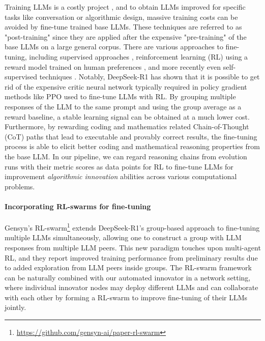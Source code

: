 \documentclass[12pt, legalpaper]{article}
\begin{document}
Training LLMs is a costly project \citep{nikolic_survey_2022}, and to obtain LLMs improved for specific tasks like conversation or algorithmic design, massive training costs can be avoided by fine-tune trained base LLMs. 
These techniques are referred to as "post-training" since they are applied after the expensive "pre-training" of the base LLMs on a large general corpus. 
There are various approaches to fine-tuning, including supervised approaches \citep{stiennon2020learning}, reinforcement learning (RL) using a reward model trained on human preferences \citep{ouyang2022training, ye2025robust}, and more recently even self-supervised techniques \citep{wen2025unsupervised}. 
Notably, DeepSeek-R1 \citep{guo2025deepseek} has shown that it is possible to get rid of the expensive critic neural network typically required in policy gradient methods like PPO \citep{schulman2017proximal} used to fine-tune LLMs with RL. 
By grouping multiple responses of the LLM to the same prompt and using the group average as a reward baseline, a stable learning signal can be obtained at a much lower cost. 
Furthermore, by rewarding coding and mathematics related Chain-of-Thought (CoT) paths that lead to executable and provably correct results, the fine-tuning process is able to elicit better coding and mathematical reasoning properties from the base LLM. 
In our pipeline, we can regard reasoning chains from evolution runs with their metric scores as data points for RL to fine-tune LLMs for improvement \emph{algorithmic innovation} abilities across various computational problems. 


\paragraph{Incorporating RL-swarms for fine-tuning}

Gensyn's RL-swarm\footnote{\url{https://github.com/gensyn-ai/paper-rl-swarm}} extends DeepSeek-R1's group-based approach to fine-tuning multiple LLMs simultaneously, allowing one to construct a group with LLM responses from multiple LLM peers. 
This new paradigm touches upon multi-agent RL, and they report improved training performance from preliminary results due to added exploration from LLM peers inside groups. 
The RL-swarm framework can be naturally combined with our automated innovator in a network setting, where individual innovator nodes may deploy different LLMs and can collaborate with each other by forming a RL-swarm to improve fine-tuning of their LLMs jointly. 
\end{document}
